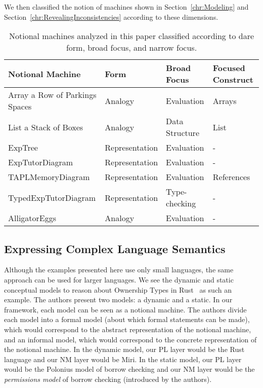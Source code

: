 We then classified the notion of machines shown in Section~\ref{chr:Modeling} and Section~\ref{chr:RevealingInconsistencies} according to these dimensions.

\begin{table}[]
\begin{tabular}{|l||l|l|l|}
\hline
\textbf{Notional Machine}      & \textbf{Form} & \textbf{Broad Focus} & \textbf{Focused Construct} \\ \hline
\hline
\hline
Array a Row of Parkings Spaces & Analogy        & Evaluation     & Arrays       \\ \hline
List a Stack of Boxes          & Analogy        & Data Structure & List         \\ \hline
ExpTree                        & Representation & Evaluation     & -            \\ \hline
ExpTutorDiagram                & Representation & Evaluation     & -            \\ \hline
TAPLMemoryDiagram              & Representation & Evaluation     & References   \\ \hline
TypedExpTutorDiagram           & Representation & Type-checking  & -            \\ \hline
AlligatorEggs                  & Analogy        & Evaluation     & -            \\ \hline
\end{tabular}
\caption{Notional machines analyzed in this paper classified according to dare form, broad focus, and narrow focus.}
\label{tab:our-nm-classification}
\end{table}

\subsection{Expressing Complex Language Semantics}
\label{sec:more-complexity}

Although the examples presented here use only small languages,
the same approach can be used for larger languages.
We see
the dynamic and static conceptual models
to reason about Ownership Types in Rust~\citep{crichtonGroundedConceptualModel2023}
as such an example.
The authors present two models: a dynamic and a static.
In our framework,
each model can be seen as a notional machine.
The authors divide each model into a formal model (about which formal statements can be made), which would correspond to the abstract representation of the notional machine,
and an informal model, which would correspond to the concrete representation of the notional machine.
%
In the dynamic model,
our PL layer would be the Rust language
and
our NM layer would be Miri.
%
In the static model,
our PL layer would be the Polonius model of borrow checking
and
our NM layer would be the \emph{permissions model} of borrow checking
(introduced by the authors).

